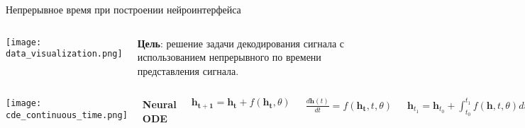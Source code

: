 \documentclass{beamer}
\begin{document}
\begin{frame}{Непрерывное время при построении нейроинтерфейса}



\begin{columns}[c]
\texttt{[image: data\_visualization.png]}

\large

\textbf{Цель}: решение задачи декодирования сигнала с использованием непрерывного по времени представления сигнала.




\end{columns}
\begin{columns}[c]
\texttt{[image: cde\_continuous\_time.png]}

\Large{\textbf{Neural ODE}}

\normalsize


$\mathbf{h_{t+1}} = \mathbf{h_t} + f(\mathbf{h_t}, \theta)$

\large

\bigskip


$\frac{d\mathbf{h}(t)}{dt} = f(\mathbf{h_t}, t, \theta)$

\normalsize

\bigskip

$\mathbf{h}_{t_1} = \mathbf{h}_{t_0} + \int_{t_0}^{t_1} f(\mathbf{h}, t, \theta) dt$

\end{columns}

\end{frame}
\end{document}
